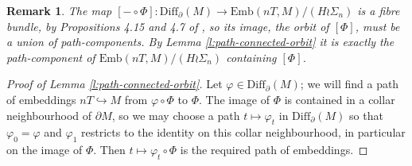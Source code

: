 \documentclass[reqno,a4paper]{article}
\numberwithin{equation}{section}
\theoremstyle{italicised}
\theoremstyle{upright}
\newtheorem{rmk}[thm]{Remark}
\theoremstyle{italicised-restate}
\begin{document}
\begin{rmk}\label{r:path-connected-orbit}
The map $[- \circ \Phi] \colon \mathrm{Diff}_\partial(M) \to \mathrm{Emb}(nT,M)/(H \wr \Sigma_n)$ is a fibre bundle, by Propositions 4.15 and 4.7 of \cite{Palmer2018HomologicalstabilitymoduliI}, so its image, the orbit of $[\Phi]$, must be a union of path-components. By Lemma \ref{l:path-connected-orbit} it is exactly the path-component of $\mathrm{Emb}(nT,M)/(H \wr \Sigma_n)$ containing $[\Phi]$.
\end{rmk}

\begin{proof}[Proof of Lemma \ref{l:path-connected-orbit}]
Let $\varphi \in \mathrm{Diff}_\partial(M)$; we will find a path of embeddings $nT \hookrightarrow M$ from $\varphi \circ \Phi$ to $\Phi$. The image of $\Phi$ is contained in a collar neighbourhood of $\partial M$, so we may choose a path $t \mapsto \varphi_t$ in $\mathrm{Diff}_\partial(M)$ so that $\varphi_0 = \varphi$ and $\varphi_1$ restricts to the identity on this collar neighbourhood, in particular on the image of $\Phi$. Then $t \mapsto \varphi_t \circ \Phi$ is the required path of embeddings.
\end{proof}
\end{document}
